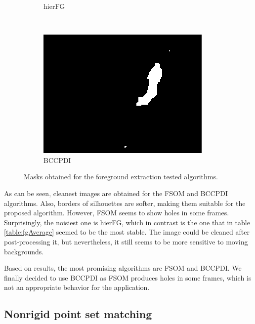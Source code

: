 \begin{figure}[t]
\begin{subfigure}[b]{0.19\textwidth}
                \caption{hierFG}
                \label{fig:cp02_hierFGmask}
        \end{subfigure}%
	~ %
	\begin{subfigure}[b]{0.19\textwidth}
                \centering
                \includegraphics[width=\textwidth]{fig17.jpg}
                \caption{BCCPDI}
                \label{fig:cp02_bccpdiMask}
        \end{subfigure}%

        \caption{Masks obtained for the foreground extraction tested algorithms.}\label{fig:cp02_fgMasks}
\end{figure}

As can be seen, cleanest images are obtained for the FSOM and BCCPDI algorithms. Also, borders of silhouettes 
are softer, making them suitable for the proposed algorithm. However, FSOM seems to show holes in some frames. 
Surprisingly, the noisiest one is hierFG, which in contrast is the one that in table \ref{table:fgAverage} seemed to be 
the most stable. The image could be cleaned after post-processing it, but nevertheless, it still seems to be more 
sensitive to moving backgrounds.

Based on results, the most promising algorithms are FSOM and BCCPDI. We finally decided to use BCCPDI as FSOM produces holes in some frames, which is not an appropriate behavior for the application.

\subsection{Nonrigid point set matching}\label{ch:chapter02_02_02}

